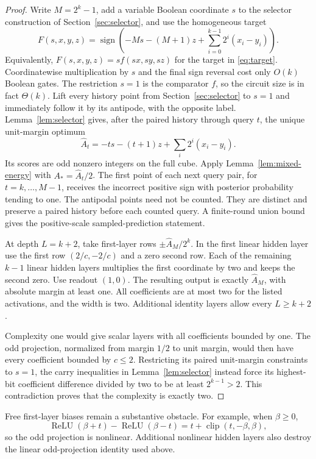 \begin{proof}
Write $M=2^k-1$, add a variable Boolean coordinate $s$ to the selector
construction of Section~\ref{sec:selector}, and use the homogeneous target
\[
 F(s,x,y,z)=\operatorname{sign}\left(
   -Ms-(M+1)z+\sum_{i=0}^{k-1}2^i(x_i-y_i)\right).
\]
Equivalently, $F(s,x,y,z)=s f(sx,sy,sz)$ for the target in
\eqref{eq:target}. Coordinatewise multiplication by $s$ and the final
sign reversal cost only $O(k)$ Boolean gates.
The restriction $s=1$ is the comparator $f$, so the circuit size
is in fact $\Theta(k)$. Lift every history
point from Section~\ref{sec:selector} to $s=1$ and immediately follow it by its antipode, with the
opposite label. Lemma~\ref{lem:selector} gives, after the
paired history through query $t$, the unique unit-margin optimum
\[
 \widehat A_t=-ts-(t+1)z+\sum_i2^i(x_i-y_i).
\]
Its scores are odd nonzero integers on the full cube. Apply
Lemma~\ref{lem:mixed-energy} with $A_*=\widehat A_t/2$. The first point of each
next query pair, for $t=k,\ldots,M-1$, receives the incorrect positive
sign with posterior probability tending to one. The antipodal points
need not be counted. They are distinct and preserve a paired history
before each counted query. A finite-round union bound gives the
positive-scale sampled-prediction statement.

At depth $L=k+2$, take first-layer rows $\pm\widehat A_M/2^k$. In the first
linear hidden layer use the first row $(2/c,-2/c)$ and a zero second
row. Each of the remaining $k-1$ linear hidden layers multiplies the
first coordinate by two and keeps the second zero. Use readout
$(1,0)$. The resulting output is exactly $\widehat A_M$, with absolute margin at
least one. All coefficients are at most two for the listed activations,
and the width is two. Additional identity layers allow every
$L\ge k+2$.

Complexity one would give scalar layers with all coefficients bounded
by one. The odd projection, normalized from margin $1/2$ to unit
margin, would then have every coefficient bounded by $c\le2$.
Restricting its paired unit-margin constraints to $s=1$, the carry
inequalities in Lemma~\ref{lem:selector} instead force its highest-bit
coefficient difference divided by two to be at least
$2^{k-1}>2$. This contradiction proves that the complexity is exactly
two.
\end{proof}

Free first-layer biases remain a substantive obstacle. For example,
when $\beta\ge0$,
\[
 \operatorname{ReLU}(\beta+t)-\operatorname{ReLU}(\beta-t)
 =t+\operatorname{clip}(t,-\beta,\beta),
\]
so the odd projection is nonlinear. Additional nonlinear hidden layers
also destroy the linear odd-projection identity used above.
